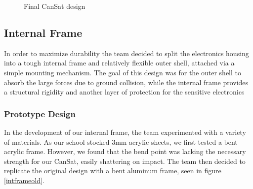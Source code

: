 \documentclass[]{report}
\begin{document}
\begin{figure}
\begin{subfigure}{.5\textwidth}
	\end{subfigure}
	\caption{Final CanSat design}
	\label{newcansat}
\end{figure}


\subsection{Internal Frame}
In order to maximize durability the team decided to split the electronics housing into a tough internal frame and relatively flexible outer shell, attached via a simple mounting mechanism. The goal of this design was for the outer shell to absorb the large forces due to ground collision, while the internal frame provides a structural rigidity and another layer of protection for the sensitive electronics
\subsubsection{Prototype Design}
In the development of our internal frame, the team experimented with a variety of materials. As our school stocked 3mm acrylic sheets, we first tested a bent acrylic frame. However, we found that the bend point was lacking the necessary strength for our CanSat, easily shattering on impact. The team then decided to replicate the original design with a bent aluminum frame, seen in figure \ref{intframeold}. 

\end{document}
